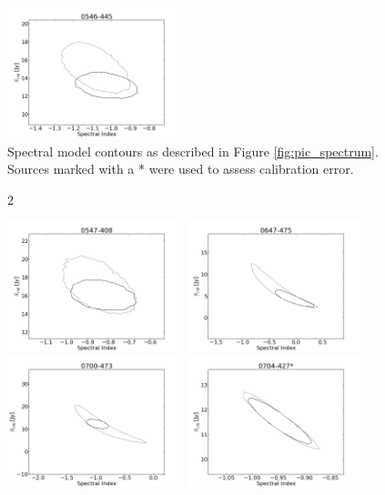 \documentclass[preprint]{aastex}
\begin{document}
\begin{figure}[htbp]
\begin{center}
\includegraphics[width=2in]{plots/0546-445_SI_MCMC.png} %
\end{center}
\caption{Spectral model contours as described in Figure \ref{fig:pic_spectrum}. Sources marked with a
* were used to assess calibration error.
}\label{fig:SI_contour_1}
\end{figure}
\clearpage
\begin{figure}[htbp]2\begin{center}
\includegraphics[width=2in]{plots/0547-408_SI_MCMC.png} %
\includegraphics[width=2in]{plots/0647-475_SI_MCMC.png} %
\includegraphics[width=2in]{plots/0700-473_SI_MCMC.png} %
\includegraphics[width=2in]{plots/0704-427_SI_MCMC.png} %

\end{center}
\end{figure}
\end{document}

